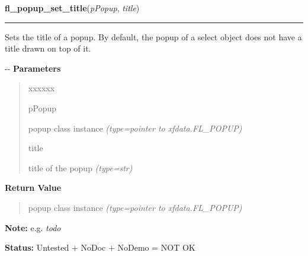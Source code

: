 \hspace{.8\funcindent}\begin{boxedminipage}{\funcwidth}

    \raggedright \textbf{fl\_popup\_set\_title}(\textit{pPopup}, \textit{title})

    \vspace{-1.5ex}

    \rule{\textwidth}{0.5\fboxrule}
\setlength{\parskip}{2ex}

Sets the title of a popup. By default, the popup of a select object
does not have a title drawn on top of it.

-{}-
\setlength{\parskip}{1ex}
      \textbf{Parameters}
      \vspace{-1ex}

      \begin{quote}
        \begin{Ventry}{xxxxxx}

          \item[pPopup]


popup class instance
            {\it (type=pointer to xfdata.FL\_POPUP)}

          \item[title]


title of the popup
            {\it (type=str)}

        \end{Ventry}

      \end{quote}

      \textbf{Return Value}
    \vspace{-1ex}

      \begin{quote}

popup class instance
      {\it (type=pointer to xfdata.FL\_POPUP)}

      \end{quote}

\textbf{Note:} 
e.g. \emph{todo}


\textbf{Status:} 
Untested + NoDoc + NoDemo = NOT OK


    \end{boxedminipage}

    \label{xformslib:flpopup:fl_popup_entry_set_callback}

    \vspace{0.5ex}

